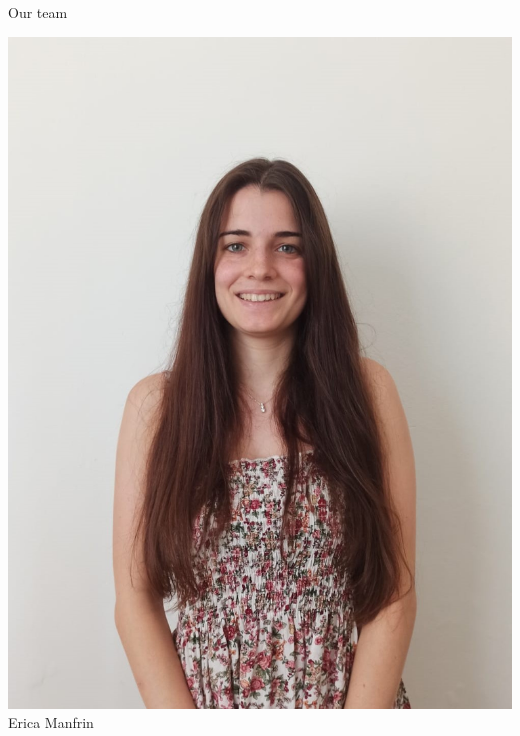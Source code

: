 \documentclass{beamer}
\begin{document}
\begin{frame}{Our team}
\begin{minipage}{0.24\textwidth}
\begin{center}
			\includegraphics[width=\columnwidth]{erikataglio.jpeg}
			Erica Manfrin
		\end{center}
	\end{minipage}
\hfill
	\begin{minipage}{0.24\textwidth}
		\begin{center}%

\end{center}
\end{minipage}
\end{frame}
\end{document}

